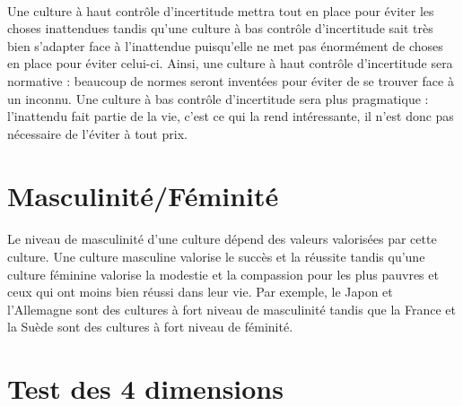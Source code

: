 \paragraph{} Une culture à haut contrôle d’incertitude mettra tout en place
pour éviter les choses inattendues tandis qu’une culture à bas contrôle
d’incertitude sait très bien s’adapter face à l’inattendue puisqu’elle ne met
pas énormément de choses en place pour éviter celui-ci.  Ainsi, une culture à
haut contrôle d’incertitude sera normative : beaucoup de normes seront
inventées pour éviter de se trouver face à un inconnu. Une culture à bas
contrôle d’incertitude sera plus pragmatique : l’inattendu fait partie de la
vie, c’est ce qui la rend intéressante, il n’est donc pas nécessaire de
l’éviter à tout prix.

\section{Masculinité/Féminité}

\paragraph{} Le niveau de masculinité d’une culture dépend des valeurs
valorisées par cette culture. Une culture masculine valorise le succès et la
réussite tandis qu’une culture féminine valorise la modestie et la compassion
pour les plus pauvres et ceux qui ont moins bien réussi dans leur vie. Par
exemple, le Japon et l’Allemagne sont des cultures à fort niveau de masculinité
tandis que la France et la Suède sont des cultures à fort niveau de féminité.

\section{Test des 4 dimensions}


